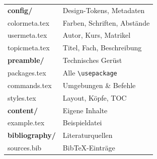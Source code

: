 \documentclass[a4paper, 11pt, ngerman]{article}
\begin{document}
\noindent
\begin{minipage}[t]{0.487\linewidth}

\begin{tcolorbox}[cs, title={Verzeichnisstruktur}]
\ttfamily\small
\begin{tabular}{@{}ll@{}}
  \textbf{config/}       & Design-Tokens, Metadaten \\[2pt]
  \quad colormeta.tex    & Farben, Schriften, Abstände \\
  \quad usermeta.tex     & Autor, Kurs, Matrikel \\
  \quad topicmeta.tex    & Titel, Fach, Beschreibung \\[4pt]
  \textbf{preamble/}     & Technisches Gerüst \\[2pt]
  \quad packages.tex     & Alle \texttt{\textbackslash usepackage} \\
  \quad commands.tex     & Umgebungen \& Befehle \\
  \quad styles.tex       & Layout, Köpfe, TOC \\[4pt]
  \textbf{content/}      & Eigene Inhalte \\[2pt]
  \quad example.tex      & Beispieldatei \\[4pt]
  \textbf{bibliography/} & Literaturquellen \\[2pt]
  \quad sources.bib      & BibTeX-Einträge \\
\end{tabular}
\end{tcolorbox}

\end{minipage}%
\hfill
\end{document}
